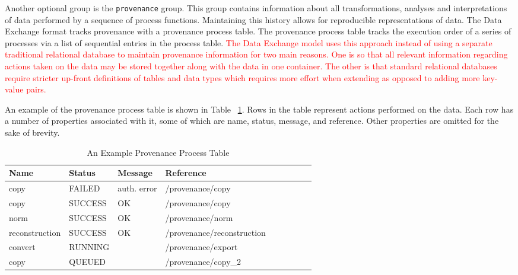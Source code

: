 \documentclass[pdf]{iucr}              %
\begin{document}
Another optional group is the \texttt{provenance} group. This group contains information about all transformations, analyses and interpretations of data performed by a sequence of process functions. Maintaining this history allows for reproducible representations of data. The Data Exchange format tracks provenance with a provenance process table. The provenance process table tracks the execution order of a series of processes via a list of sequential entries in the process table. \textcolor{red}{The Data Exchange model uses this approach instead of using a separate traditional relational database to maintain provenance information for two main reasons. One is so that all relevant information regarding actions taken on the data may be stored together along with the data in one container. The other is that standard relational databases require stricter up-front definitions of tables and data types which requires more effort when extending as opposed to adding more key-value pairs.}

An example of the provenance process table is shown in Table ~\ref{table:provenance}. Rows in the table represent actions performed on the data. Each row has a number of properties associated with it, some of which are name, status, message, and reference. Other properties are omitted for the sake of brevity.

\begin{table}
\centering
\footnotesize
\caption{An Example Provenance Process Table}
\label{table:provenance}
\begin{tabular}{l l l l l l l l l }
\toprule
\bfseries Name & \bfseries Status & \bfseries Message & \bfseries Reference \\
\midrule
copy & FAILED & auth. error & /provenance/copy  \\
copy & SUCCESS & OK & /provenance/copy  \\
norm & SUCCESS & OK & /provenance/norm  \\
reconstruction & SUCCESS & OK & /provenance/reconstruction  \\
convert & RUNNING & & /provenance/export  \\
copy & QUEUED & & /provenance/copy\_2 \\
\bottomrule
\end{tabular}
\end{table}
\end{document}
